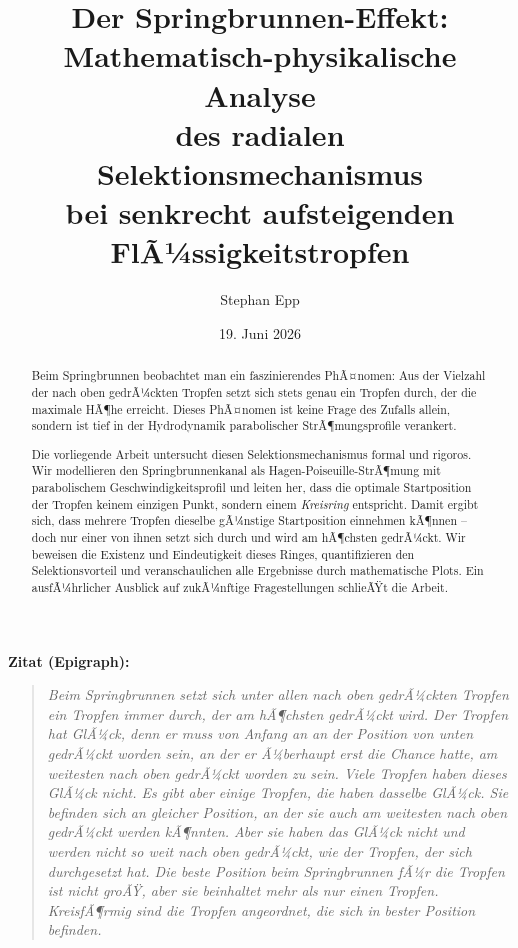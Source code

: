 ﻿\documentclass[a4paper,12pt]{article}
\title{Der Springbrunnen-Effekt:\\
\large Mathematisch-physikalische Analyse\\
des radialen Selektionsmechanismus\\
bei senkrecht aufsteigenden FlÃ¼ssigkeitstropfen}
\author{Stephan Epp}
\date{19. Juni 2026}
\theoremstyle{definition}
\begin{document}
\maketitle

\begin{abstract}
Beim Springbrunnen beobachtet man ein faszinierendes PhÃ¤nomen: Aus der Vielzahl der nach oben
gedrÃ¼ckten Tropfen setzt sich stets genau ein Tropfen durch, der die maximale HÃ¶he erreicht.
Dieses PhÃ¤nomen ist keine Frage des Zufalls allein, sondern ist tief in der Hydrodynamik
parabolischer StrÃ¶mungsprofile verankert.

\medskip

Die vorliegende Arbeit untersucht diesen Selektionsmechanismus formal und rigoros.
Wir modellieren den Springbrunnenkanal als Hagen-Poiseuille-StrÃ¶mung mit parabolischem
Geschwindigkeitsprofil und leiten her, dass die optimale Startposition der Tropfen keinem
einzigen Punkt, sondern einem \emph{Kreisring} entspricht. Damit ergibt sich, dass
mehrere Tropfen dieselbe gÃ¼nstige Startposition einnehmen kÃ¶nnen -- doch nur einer von ihnen
setzt sich durch und wird am hÃ¶chsten gedrÃ¼ckt. Wir beweisen die Existenz und Eindeutigkeit
dieses Ringes, quantifizieren den Selektionsvorteil und veranschaulichen alle Ergebnisse durch
mathematische Plots. Ein ausfÃ¼hrlicher Ausblick auf zukÃ¼nftige Fragestellungen schlieÃŸt die Arbeit.
\end{abstract}

\bigskip

\noindent\textbf{Zitat (Epigraph):}\\[4pt]
\begin{quote}
\itshape
Beim Springbrunnen setzt sich unter allen nach oben gedrÃ¼ckten Tropfen ein Tropfen immer durch,
der am hÃ¶chsten gedrÃ¼ckt wird.
Der Tropfen hat GlÃ¼ck, denn er muss von Anfang an an der Position von unten gedrÃ¼ckt worden sein,
an der er Ã¼berhaupt erst die Chance hatte, am weitesten nach oben gedrÃ¼ckt worden zu sein.
Viele Tropfen haben dieses GlÃ¼ck nicht.
Es gibt aber einige Tropfen, die haben dasselbe GlÃ¼ck.
Sie befinden sich an gleicher Position, an der sie auch am weitesten nach oben gedrÃ¼ckt werden kÃ¶nnten.
Aber sie haben das GlÃ¼ck nicht und werden nicht so weit nach oben gedrÃ¼ckt,
wie der Tropfen, der sich durchgesetzt hat.
Die beste Position beim Springbrunnen fÃ¼r die Tropfen ist nicht groÃŸ,
aber sie beinhaltet mehr als nur einen Tropfen.
KreisfÃ¶rmig sind die Tropfen angeordnet, die sich in bester Position befinden.
\end{quote}
\end{document}

